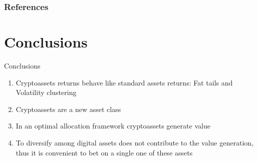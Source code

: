\documentclass[c, 10pt]{beamer}
\begin{document}
\begin{frame}[allowframebreaks] %
	\frametitle{References}

%	
	\nocite{cr1}
	\nocite{trading}
	\nocite{correlations}
	\nocite{modernptftheory}
	\nocite{risk}
	\nocite{stazionario}
	\nocite{correl}
	\nocite{crosscorr}
	\nocite{spillover}
	\nocite{corr_stock}
	\nocite{weiyi}
	\nocite{BTC2008}
	\nocite{digitalgold}
	\nocite{klein}
	\nocite{bouri}
	\nocite{corbet}
	\nocite{mark52}
	\nocite{Fabozzi7}
	\nocite{DEoptimR_manual}
	\nocite{quadp}
	\nocite{R}
	\nocite{DEoptim_book}
	\nocite{Meucci}
	\nocite{mark59}
	\nocite{samuele}
	\nocite{CMC}
	\nocite{cryptoindex}
	\nocite{cryptoindex1}

\end{frame}

\section{Conclusions}


\begin{frame}{Conclusions}
	\begin{enumerate}
		\item Cryptoassets returns behave like standard assets returns: Fat tails and Volatility clustering 
		\bigskip
			
		\item Cryptoassets are a new asset class
		\bigskip
		
		\item In an optimal allocation framework cryptoassets generate value
		\bigskip
		
		\item To diversify among digital assets does not contribute to the value generation, thus it is convenient to bet on a single one of these assets
	\end{enumerate}	
\end{frame}
\end{document}
